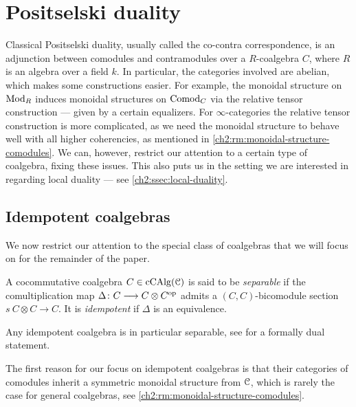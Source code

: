 
\section{Positselski duality}
\label{ch2:sec:positselski-duality}

Classical Positselski duality, usually called the co-contra correspondence, is an adjunction between comodules and contramodules over a $R$-coalgebra $C$, where $R$ is an algebra over a field $k$. In particular, the categories involved are abelian, which makes some constructions easier. For example, the monoidal structure on $\mathrm{Mod}_R$ induces monoidal structures on $\mathrm{Comod}_C$ via the relative tensor construction --- given by a certain equalizers. For $\infty$-categories the relative tensor construction is more complicated, as we need the monoidal structure to behave well with all higher coherencies, as mentioned in \cref{ch2:rm:monoidal-structure-comodules}. We can, however, restrict our attention to a certain type of coalgebra, fixing these issues. This also puts us in the setting we are interested in regarding local duality --- see \cref{ch2:ssec:local-duality}. 

\subsection{Idempotent coalgebras}
\label{ch2:ssec:idempotent-coalgebras}

We now restrict our attention to the special class of coalgebras that we will focus on for the remainder of the paper. 

\begin{definition}
    A cocommutative coalgebra $C\in \operatorname{cCAlg}(\EuScript{C})$ is said to be \emph{separable} if the comultiplication map $\Delta\colon C\longrightarrow C\otimes C^{\mathrm{op}}$ admits a $(C,C)$-bicomodule section $s\: C\otimes C\to C$. It is \emph{idempotent} if $\Delta$ is an equivalence. 
\end{definition}

\begin{remark}
    \label{ch2:rm:idempotent-implies-separable}
    Any idempotent coalgebra is in particular separable, see \cite[1.6(1)]{ramzi_2023} for a formally dual statement. 
\end{remark}

The first reason for our focus on idempotent coalgebras is that their categories of comodules inherit a symmetric monoidal structure from $\EuScript{C}$, which is rarely the case for general coalgebras, see \cref{ch2:rm:monoidal-structure-comodules}. 

